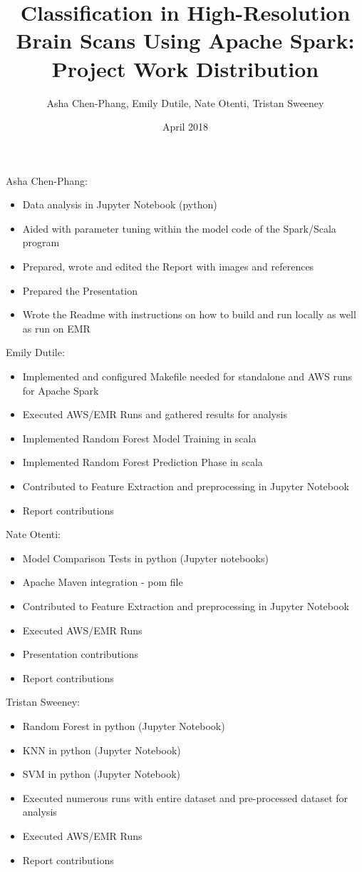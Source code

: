 \documentclass{neu_handout}
\title{Classification in High-Resolution Brain Scans Using Apache Spark: Project Work Distribution}
\author{Asha Chen-Phang, Emily Dutile, Nate Otenti, Tristan Sweeney}
\date{April 2018}
\begin{document}
\newenvironment{myitemize}
{ \begin{itemize}
    \setlength{\itemsep}{0pt}
    \setlength{\parskip}{0pt}
    \setlength{\parsep}{0pt}     }
{ \end{itemize}                  } 

Asha Chen-Phang:
\begin{myitemize}
  \item Data analysis in Jupyter Notebook (python)
   \item Aided with parameter tuning within the model code of the Spark/Scala program
  \item Prepared, wrote and edited the Report with images and references
  \item Prepared the Presentation
   \item Wrote the Readme with instructions on how to build and run locally as well as run on EMR
\end{myitemize}

Emily Dutile:
\begin{myitemize}
  \item Implemented and configured Makefile needed for standalone and AWS runs for Apache Spark
  \item Executed AWS/EMR Runs and gathered results for analysis
  \item Implemented Random Forest Model Training in scala
  \item Implemented Random Forest Prediction Phase in scala
\item Contributed to Feature Extraction and preprocessing in Jupyter Notebook
  \item Report contributions
\end{myitemize}

Nate Otenti:
\begin{myitemize}
  \item Model Comparison Tests in python (Jupyter notebooks)
   \item Apache Maven integration - pom file
    \item Contributed to Feature Extraction and preprocessing in Jupyter Notebook
   \item Executed AWS/EMR Runs
   \item Presentation contributions
  \item Report contributions
\end{myitemize}

Tristan Sweeney:
\begin{myitemize}
  \item Random Forest in python (Jupyter Notebook)
  \item KNN in python (Jupyter Notebook)
  \item SVM in python (Jupyter Notebook)
  \item Executed numerous runs with entire dataset and pre-processed dataset for analysis
  \item Executed AWS/EMR Runs
  \item Report contributions
\end{myitemize}
\end{document}
